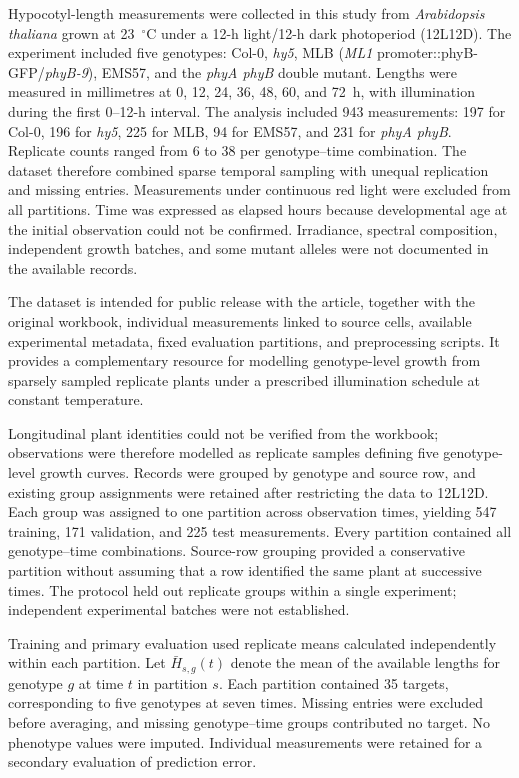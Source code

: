\documentclass[preprint,12pt,authoryear]{elsarticle}
\begin{document}
Hypocotyl-length measurements were collected in this study from \textit{Arabidopsis thaliana} grown at 23~$^{\circ}$C under a 12-h light/12-h dark photoperiod (12L12D). The experiment included five genotypes: Col-0, \textit{hy5}, MLB (\textit{ML1} promoter::phyB-GFP/\textit{phyB-9}), EMS57, and the \textit{phyA phyB} double mutant. Lengths were measured in millimetres at 0, 12, 24, 36, 48, 60, and 72~h, with illumination during the first 0--12-h interval. The analysis included 943 measurements: 197 for Col-0, 196 for \textit{hy5}, 225 for MLB, 94 for EMS57, and 231 for \textit{phyA phyB}. Replicate counts ranged from 6 to 38 per genotype--time combination. The dataset therefore combined sparse temporal sampling with unequal replication and missing entries. Measurements under continuous red light were excluded from all partitions. Time was expressed as elapsed hours because developmental age at the initial observation could not be confirmed. Irradiance, spectral composition, independent growth batches, and some mutant alleles were not documented in the available records.

The dataset is intended for public release with the article, together with the original workbook, individual measurements linked to source cells, available experimental metadata, fixed evaluation partitions, and preprocessing scripts. It provides a complementary resource for modelling genotype-level growth from sparsely sampled replicate plants under a prescribed illumination schedule at constant temperature.

Longitudinal plant identities could not be verified from the workbook; observations were therefore modelled as replicate samples defining five genotype-level growth curves. Records were grouped by genotype and source row, and existing group assignments were retained after restricting the data to 12L12D. Each group was assigned to one partition across observation times, yielding 547 training, 171 validation, and 225 test measurements. Every partition contained all genotype--time combinations. Source-row grouping provided a conservative partition without assuming that a row identified the same plant at successive times. The protocol held out replicate groups within a single experiment; independent experimental batches were not established.

Training and primary evaluation used replicate means calculated independently within each partition. Let $\bar H_{s,g}(t)$ denote the mean of the available lengths for genotype $g$ at time $t$ in partition $s$. Each partition contained 35 targets, corresponding to five genotypes at seven times. Missing entries were excluded before averaging, and missing genotype--time groups contributed no target. No phenotype values were imputed. Individual measurements were retained for a secondary evaluation of prediction error.
\end{document}
